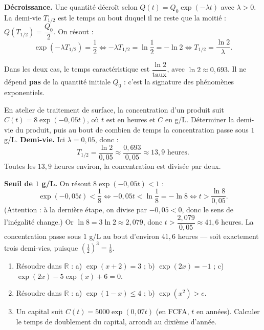 \documentclass[11pt]{article}
\newcommand{\cle}[1]{{\popxbold\color{popdark}#1}}
\begin{document}
\textbf{Décroissance.} Une quantité décroît selon $Q(t) = Q_0 \exp(-\lambda t)$ avec $\lambda > 0$. La \cle{demi-vie} $T_{1/2}$ est le temps au bout duquel il ne reste que la moitié : $Q(T_{1/2}) = \dfrac{Q_0}{2}$. On résout :
\[
\exp(-\lambda T_{1/2}) = \frac{1}{2} \iff -\lambda T_{1/2} = \ln\frac{1}{2} = -\ln 2 \iff T_{1/2} = \frac{\ln 2}{\lambda}.
\]

\begin{aretenir}
Dans les deux cas, le temps caractéristique est $\dfrac{\ln 2}{\text{taux}}$, avec $\ln 2 \approx 0,693$. Il ne dépend \textbf{pas} de la quantité initiale $Q_0$ : c'est la signature des phénomènes exponentiels.
\end{aretenir}

\begin{exoresolu}
En atelier de traitement de surface, la concentration d'un produit suit $C(t) = 8\exp(-0,05t)$, où $t$ est en heures et $C$ en g/L. Déterminer la demi-vie du produit, puis au bout de combien de temps la concentration passe sous $1$ g/L.
\tcblower
\textbf{Demi-vie.} Ici $\lambda = 0,05$, donc :
\[
T_{1/2} = \frac{\ln 2}{0,05} \approx \frac{0,693}{0,05} \approx 13,9 \text{ heures}.
\]
Toutes les $13,9$ heures environ, la concentration est divisée par deux.

\textbf{Seuil de $1$ g/L.} On résout $8\exp(-0,05t) < 1$ :
\[
\exp(-0,05t) < \frac{1}{8} \iff -0,05t < \ln\frac{1}{8} = -\ln 8 \iff t > \frac{\ln 8}{0,05}.
\]
(Attention : à la dernière étape, on divise par $-0,05 < 0$, donc le sens de l'inégalité change.) Or $\ln 8 = 3\ln 2 \approx 2,079$, donc $t > \dfrac{2,079}{0,05} \approx 41,6$ heures. La concentration passe sous $1$ g/L au bout d'environ $41,6$ heures — soit exactement trois demi-vies, puisque $\left(\tfrac12\right)^3 = \tfrac18$.
\end{exoresolu}

\begin{exercice}
\begin{enumerate}
\item Résoudre dans $\mathbb{R}$ : a) $\exp(x+2) = 3$ ; b) $\exp(2x) = -1$ ; c) $\exp(2x) - 5\exp(x) + 6 = 0$.
\item Résoudre dans $\mathbb{R}$ : a) $\exp(1 - x) \leq 4$ ; b) $\exp(x^2) > e$.
\item Un capital suit $C(t) = 5000\exp(0,07t)$ (en FCFA, $t$ en années). Calculer le temps de doublement du capital, arrondi au dixième d'année.
\end{enumerate}
\end{exercice}
\end{document}
